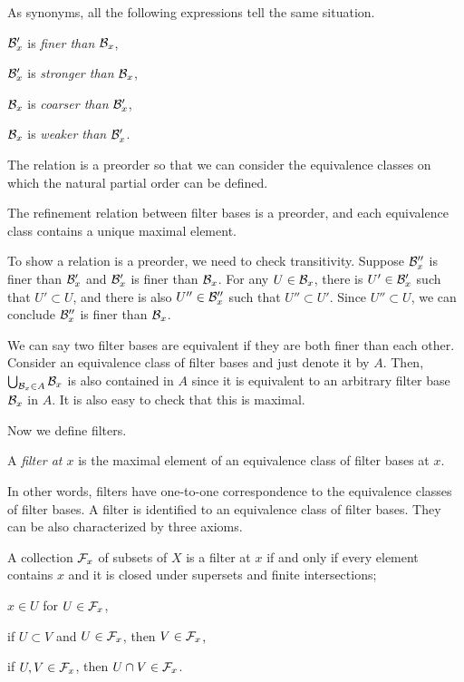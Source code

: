 As synonyms, all the following expressions tell the same situation.
\begin{cond}
\item $\mathcal{B}'_x$ is \emph{finer than} $\mathcal{B}_x$,
\item $\mathcal{B}'_x$ is \emph{stronger than} $\mathcal{B}_x$,
\item $\mathcal{B}_x$ is \emph{coarser than} $\mathcal{B}'_x$,
\item $\mathcal{B}_x$ is \emph{weaker than} $\mathcal{B}'_x$.
\end{cond}
The relation is a preorder so that we can consider the equivalence classes on which the natural partial order can be defined.

\begin{prop}
The refinement relation between filter bases is a preorder, and each equivalence class contains a unique maximal element.
\end{prop}
\begin{pf}
To show a relation is a preorder, we need to check transitivity.
Suppose $\mathcal{B}''_x$ is finer than $\mathcal{B}'_x$ and $\mathcal{B}'_x$ is finer than $\mathcal{B}_x$.
For any $U\in\mathcal{B}_x$, there is $U'\in\mathcal{B}'_x$ such that $U'\subset U$, and there is also $U''\in\mathcal{B}''_x$ such that $U''\subset U'$.
Since $U''\subset U$, we can conclude $\mathcal{B}''_x$ is finer than $\mathcal{B}_x$.

We can say two filter bases are equivalent if they are both finer than each other.
Consider an equivalence class of filter bases and just denote it by $A$.
Then, $\bigcup_{\mathcal{B}_x\in A}\mathcal{B}_x$ is also contained in $A$ since it is equivalent to an arbitrary filter base $\mathcal{B}_x$ in $A$.
It is also easy to check that this is maximal.
\end{pf}

Now we define filters.

\begin{defn}
A \emph{filter at $x$} is the maximal element of an equivalence class of filter bases at $x$.
\end{defn}

In other words, filters have one-to-one correspondence to the equivalence classes of filter bases.
A filter is identified to an equivalence class of filter bases.
They can be also characterized by three axioms.

\begin{thm}
A collection $\mathcal{F}_x$ of subsets of $X$ is a filter at $x$ if and only if every element contains $x$ and it is closed under supersets and finite intersections;
\begin{cond}
\item $x\in U$ for $U\in\mathcal{F}_x$,
\item if $U\subset V$ and $U\in\mathcal{F}_x$, then $V\in\mathcal{F}_x$,
\item if $U,V\in\mathcal{F}_x$, then $U\cap V\in\mathcal{F}_x$.
\end{cond}
\end{thm}
\begin{pf}
\end{pf}


